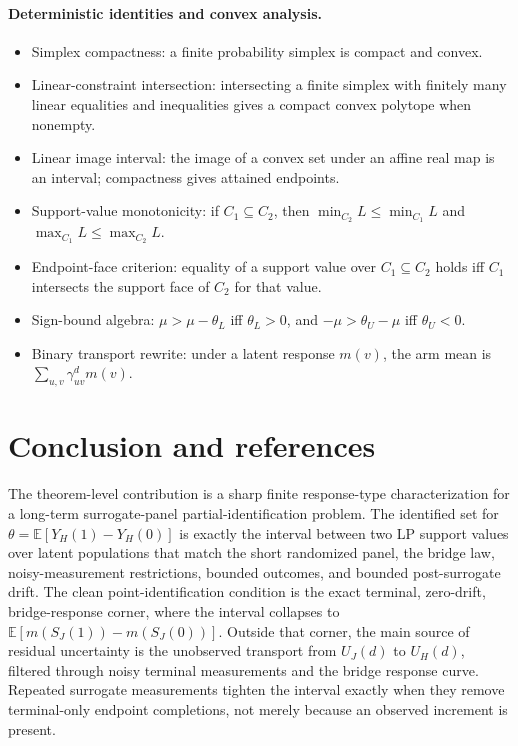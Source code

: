 \documentclass[11pt]{article}
\newcommand{\E}{\mathbb{E}}
\theoremstyle{definition}
\theoremstyle{plain}
\theoremstyle{remark}
\begin{document}
\paragraph{Deterministic identities and convex analysis.}
\begin{itemize}[leftmargin=*]
  \item Simplex compactness: a finite probability simplex is compact and convex.
  \item Linear-constraint intersection: intersecting a finite simplex with finitely many linear equalities and inequalities gives a compact convex polytope when nonempty.
  \item Linear image interval: the image of a convex set under an affine real map is an interval; compactness gives attained endpoints.
  \item Support-value monotonicity: if \(C_1\subseteq C_2\), then \(\min_{C_2}L\le\min_{C_1}L\) and \(\max_{C_1}L\le\max_{C_2}L\).
  \item Endpoint-face criterion: equality of a support value over \(C_1\subseteq C_2\) holds iff \(C_1\) intersects the support face of \(C_2\) for that value.
  \item Sign-bound algebra: \(\mu> \mu-\theta_L\) iff \(\theta_L>0\), and \(-\mu>\theta_U-\mu\) iff \(\theta_U<0\).
  \item Binary transport rewrite: under a latent response \(m(v)\), the arm mean is \(\sum_{u,v}\gamma^d_{uv}m(v)\).
\end{itemize}

\section{Conclusion and references}
The theorem-level contribution is a sharp finite response-type characterization for a long-term surrogate-panel partial-identification problem.  The identified set for \(\theta=\E[Y_H(1)-Y_H(0)]\) is exactly the interval between two LP support values over latent populations that match the short randomized panel, the bridge law, noisy-measurement restrictions, bounded outcomes, and bounded post-surrogate drift.  The clean point-identification condition is the exact terminal, zero-drift, bridge-response corner, where the interval collapses to \(\E[m(S_J(1))-m(S_J(0))]\).  Outside that corner, the main source of residual uncertainty is the unobserved transport from \(U_J(d)\) to \(U_H(d)\), filtered through noisy terminal measurements and the bridge response curve.  Repeated surrogate measurements tighten the interval exactly when they remove terminal-only endpoint completions, not merely because an observed increment is present.
\end{document}
